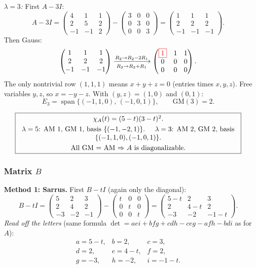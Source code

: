 \documentclass[a4paper,12pt]{article}
\newcommand{\piv}[1]{{\color{red}\boxed{#1}}}
\begin{document}
\textit{$\lambda = 3$:} First $A - 3I$:
\[
A - 3I = \begin{pmatrix} 4 & 1 & 1 \\ 2 & 5 & 2 \\ -1 & -1 & 2 \end{pmatrix} - \begin{pmatrix} 3 & 0 & 0 \\ 0 & 3 & 0 \\ 0 & 0 & 3 \end{pmatrix} = \begin{pmatrix} 1 & 1 & 1 \\ 2 & 2 & 2 \\ -1 & -1 & -1 \end{pmatrix}.
\]
Then Gauss:
\[
\begin{pmatrix} 1 & 1 & 1 \\ 2 & 2 & 2 \\ -1 & -1 & -1 \end{pmatrix}
\xrightarrow[R_3 \to R_3 + R_1]{R_2 \to R_2 - 2R_1}
\begin{pmatrix} \piv{1} & 1 & 1 \\ 0 & 0 & 0 \\ 0 & 0 & 0 \end{pmatrix}.
\]
The only nontrivial row $(1,1,1)$ means $x + y + z = 0$ (entries times $x, y, z$). Free variables $y, z$, so $x = -y - z$. With $(y,z) = (1,0)$ and $(0,1)$:
\[
E_3 = \operatorname{span}\{(-1, 1, 0),\, (-1, 0, 1)\}, \qquad \text{GM}(3) = 2.
\]

\[
\fbox{\parbox{0.93\textwidth}{\centering
$\chi_A(t) = (5-t)(3-t)^2$. \\[3pt]
$\lambda = 5$: AM $1$, GM $1$, basis $\{(-1,-2,1)\}$. \quad
$\lambda = 3$: AM $2$, GM $2$, basis $\{(-1,1,0),(-1,0,1)\}$. \\[3pt]
All GM $=$ AM $\Rightarrow$ $A$ is diagonalizable.
}}
\]

\subsubsection*{Matrix $B$}

\textbf{Method 1: Sarrus.} First $B - tI$ (again only the diagonal):
\[
B - tI = \begin{pmatrix} 5 & 2 & 3 \\ 2 & 4 & 2 \\ -3 & -2 & -1 \end{pmatrix} - \begin{pmatrix} t & 0 & 0 \\ 0 & t & 0 \\ 0 & 0 & t \end{pmatrix} = \begin{pmatrix} 5-t & 2 & 3 \\ 2 & 4-t & 2 \\ -3 & -2 & -1-t \end{pmatrix}.
\]
\emph{Read off the letters} (same formula $\det = aei + bfg + cdh - ceg - afh - bdi$ as for $A$):
\[
\begin{array}{lll}
a = 5-t, & b = 2, & c = 3, \\
d = 2, & e = 4-t, & f = 2, \\
g = -3, & h = -2, & i = -1-t.
\end{array}
\]
\end{document}
